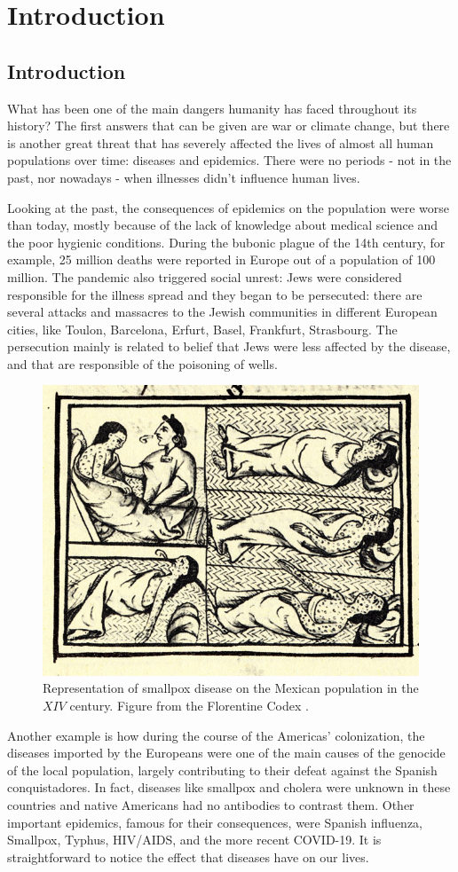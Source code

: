 \part{Introduction}

\chapter{Introduction}

What has been one of the main dangers humanity has faced throughout its history? The first answers that can be given are war or climate change, but there is another great threat that has severely affected the lives of almost all human populations over time: diseases and epidemics. There were no periods - not in the past, nor nowadays - when illnesses didn't influence human lives. 

Looking at the past, the consequences of epidemics on the population were worse than today, mostly because of the lack of knowledge about medical science and the poor hygienic conditions. During the bubonic plague of the 14th century, for example, 25 million deaths were reported in Europe out of a population of 100 million. The pandemic also triggered social unrest: Jews were considered responsible for the illness spread and they began to be persecuted: there are several attacks and massacres to the Jewish communities in different European cities, like Toulon, Barcelona, Erfurt, Basel, Frankfurt, Strasbourg. The persecution mainly is related to belief that Jews were less affected by the disease, and that are responsible of the poisoning of wells.
\begin{figure}[]
	\centering
	\includegraphics[width=0.4\linewidth]{0_introduction/images_introduction/FlorentineCodex_smallpox}
	\caption[Smallpox on native Americans]{Representation of smallpox disease on the Mexican population in the $XIV$ century. Figure from the Florentine Codex \cite{Sahagun1965}. }
	\label{fig:florentinecodexsmallpox}
\end{figure}

Another example is how during the course of the Americas' colonization, the diseases imported by the Europeans were one of the main causes of the genocide of the local population, largely contributing to their defeat against the Spanish conquistadores. In fact, diseases like smallpox and cholera were unknown in these countries and native Americans had no antibodies to contrast them. 
Other important epidemics, famous for their consequences, were Spanish influenza, Smallpox, Typhus, HIV/AIDS, and the more recent COVID-19. 
It is straightforward to notice the effect that diseases have on our lives.

